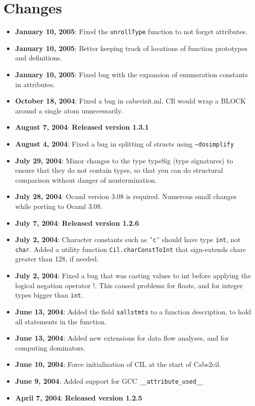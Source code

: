\documentclass{article}
\def\t#1{{\tt #1}}
\begin{document}
\section{Changes}\label{sec-changes}
\begin{itemize}
\item {\bf January 10, 2005}: Fixed the \t{unrollType} function to not forget
  attributes. 
\item {\bf January 10, 2005}: Better keeping track of locations of function
  prototypes and definitions. 
\item {\bf January 10, 2005}: Fixed bug with the expansion of enumeration
  constants in attributes.
\item {\bf October 18, 2004}: Fixed a bug in cabsvisit.ml. CIl would wrap a
  BLOCK around a single atom unnecessarily. 
\item {\bf August 7, 2004}: {\bf Released version 1.3.1}
\item {\bf August 4, 2004}: Fixed a bug in splitting of structs using 
  \t{--dosimplify}
\item {\bf July 29, 2004}: Minor changes to the type typeSig (type signatures)
  to ensure that they do not contain types, so that you can do structural
  comparison without danger of nontermination. 
\item {\bf July 28, 2004}: Ocaml version 3.08 is required. Numerous small 
  changes while porting to Ocaml 3.08. 
\item {\bf July 7, 2004}: {\bf Released version 1.2.6}
\item {\bf July 2, 2004}:  Character constants such as \t{'c'} should
  have type \t{int}, not \t{char}.  Added a utility function
  \t{Cil.charConstToInt} that sign-extends chars greater than 128, if needed.
\item {\bf July 2, 2004}: Fixed a bug that was casting values to int
  before applying the logical negation operator !.  This caused
  problems for floats, and for integer types bigger than \t{int}.
\item {\bf June 13, 2004}: Added the field \t{sallstmts} to a function
  description, to hold all statements in the function.
\item {\bf June 13, 2004}: Added new extensions for data flow analyses, and
  for computing dominators.
\item {\bf June 10, 2004}: Force initialization of CIL at the start of
Cabs2cil. 
\item {\bf June 9, 2004}: Added support for GCC \t{\_\_attribute\_used\_\_}
\item {\bf April 7, 2004}: {\bf Released version 1.2.5}

\end{itemize}
\end{document}

